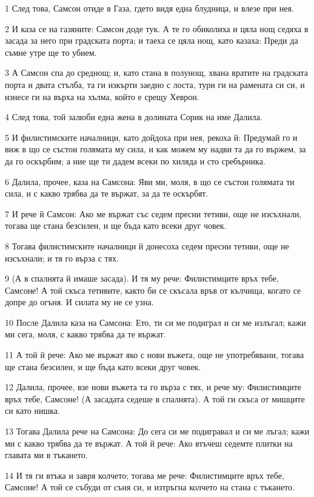 \par 1 След това, Самсон отиде в Газа, гдето видя една блудница, и влезе при нея.
\par 2 И каза се на газяните: Самсон доде тук. А те го обиколиха и цяла нощ седяха в засада за него при градската порта; и таеха се цяла нощ, като казаха: Преди да съмне утре ще то убием.
\par 3 А Самсон спа до среднощ; и, като стана в полунощ, хвана вратите на градската порта и двата стълба, та ги изкърти заедно с лоста, тури ги на рамената си си, и изнесе ги на върха на хълма, който е срещу Хеврон.
\par 4 След това, той залюби една жена в долината Сорик на име Далила.
\par 5 И филистимските началници, като дойдоха при нея, рекоха й: Предумай го и виж в що се състои голямата му сила, и как можем му надви та да го вържем, за да го оскърбим; а ние ще ти дадем всеки по хиляда и сто сребърника.
\par 6 Далила, прочее, каза на Самсона: Яви ми, моля, в що се състои голямата ти сила, и с какво трябва да те вържат, за да те оскърбят.
\par 7 И рече й Самсон: Ако ме вържат със седем пресни тетиви, още не изсъхнали, тогава ще стана безсилен, и ще бъда като всеки друг човек.
\par 8 Тогава филистимските началници й донесоха седем пресни тетиви, още не изсъхнали; и тя го върза с тях.
\par 9 (А в спалнята й имаше засада). И тя му рече: Филистимците връх тебе, Самсоне! А той скъса тетивите, както би се скъсала връв от кълчища, когато се допре до огъня. И силата му не се узна.
\par 10 После Далила каза на Самсона: Ето, ти си ме подиграл и си ме излъгал; кажи ми сега, моля, с какво трябва да те вържат.
\par 11 А той й рече: Ако ме вържат яко с нови въжета, още не употребявани, тогава ще стана безсилен, и ще бъда като всеки друг човек.
\par 12 Далила, прочее, взе нови въжета та го върза с тях, и рече му: Филистимците връх тебе, Самсоне! (А засадата седеше в спалнята). А той ги скъса от мишците си като нишка.
\par 13 Тогава Далила рече на Самсона: До сега си ме подигравал и си ме лъгал; кажи ми с какво трябва да те вържат. А той й рече: Ако втъчеш седемте плитки на главата ми в тъкането.
\par 14 И тя ги втъка и завря колчето; тогава ме рече: Филистимците връх тебе, Самсоне! А той се събуди от съня си, и изтръгна колчето на стана с тъкането.
